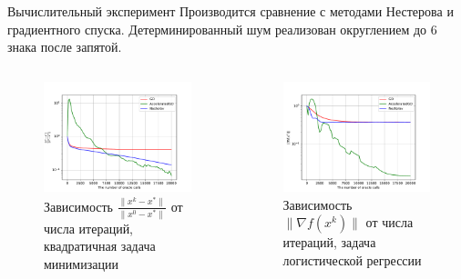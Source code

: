 \documentclass{beamer}
\begin{document}
\begin{frame}{Вычислительный эксперимент}
Производится сравнение с методами Нестерова и градиентного спуска. Детерминированный шум реализован округлением до 6 знака после запятой.
\begin{columns}[c]
    \begin{figure}
    \includegraphics[width=1.0\textwidth]{Deterministic_quadratic_GD_AGD_Nesterov_15.pdf}
        \caption*{Зависимость $\frac{\|x^k - x^*\|}{\|x^0 - x^*\|}$ от числа итераций, квадратичная задача минимизации}
    \end{figure}

    \begin{figure}
    \includegraphics[width=1.0\textwidth]{Non_stochastic_Logreg_GD_AGD_Nesterov_15_1e-07_1e-05.pdf}
        \caption*{Зависимость $\|\nabla f(x^k)\|$ от числа итераций, задача логистической регрессии}
    \end{figure}
\end{columns}
\end{frame}
\end{document}
